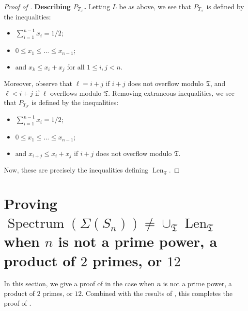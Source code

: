 \documentclass[letterpaper,10pt]{amsart}
\DeclareMathOperator{\Len}{Len}
\DeclareMathOperator{\Spe}{Spectrum}
\newcommand{\mfT}{\mathfrak{T}}
\newcommand{\cF}{\mathcal{F}}
\theoremstyle{definition}
\theoremstyle{remark}
\begin{document}
\begin{proof}[Proof of ]
\noindent \textbf{Describing $P_{T_{\cF}}$.} Letting $L$ be as above, we see that $P_{T_{\cF}}$ is defined by the inequalities:
\begin{itemize}
    \item $\sum_{i = 1}^{n-1}x_i = 1/2$;
    \item $0 \leq x_1 \leq \dots \leq x_{n-1}$;
    \item and $x_{k} \leq x_i + x_j$ for all $1 \leq i,j < n$. 
\end{itemize}
Moreover, observe that $\ell = i + j$ if $i + j$ does not overflow modulo $\mfT$, and $\ell < i+j$ if $\ell$ overflows modulo $\mfT$. Removing extraneous inequalities, we see that $P_{T_{\cF}}$ is defined by the inequalities:
\begin{itemize}
    \item $\sum_{i = 1}^{n-1}x_i = 1/2$;
    \item $0 \leq x_1 \leq \dots \leq x_{n-1}$;
    \item and $x_{i+j} \leq x_i + x_j$ if $i+j$ does not overflow modulo $\mfT$. 
\end{itemize}
Now, these are precisely the inequalities defining $\Len_{\mfT}$. 
\end{proof}

\section{Proving $\Spe(\Sigma(S_n)) \neq \cup_{\mfT}\Len_{\mfT}$ when $n$ is not a prime power, a product of $2$ primes, or $12$}
\label{sec:lenstra-spectrum-bad}

In this section, we give a proof of  in the case when $n$ is not a prime power, a product of $2$ primes, or $12$. Combined with the results of , this completes the proof of .
\end{document}
